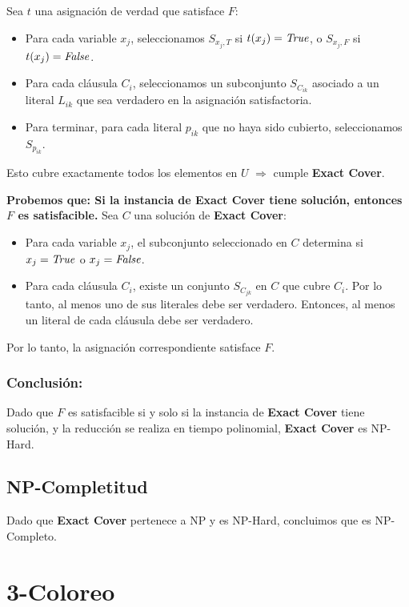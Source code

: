 \documentclass[a4paper,12pt]{article}
\begin{document}
Sea $t$ una asignación de verdad que satisface $F$:
\begin{itemize}
    \item Para cada variable $x_j$, seleccionamos $S_{x_j,T}$ si $t(x_j) = \text{\textit{True}}$, o $S_{x_j,F}$ si $t(x_j) = \text{\textit{False}}$.
    \item Para cada cláusula $C_i$, seleccionamos un subconjunto $S_{C_{ik}}$ asociado a un literal $L_{ik}$ que sea verdadero en la asignación satisfactoria.
    \item Para terminar, para cada literal $p_{ik}$ que no haya sido cubierto, seleccionamos $S_{p_{ik}}$.
\end{itemize}
Esto cubre exactamente todos los elementos en $U$ $\Rightarrow$ cumple \textbf{Exact Cover}.

\textbf{Probemos que: Si la instancia de \textbf{Exact Cover} tiene solución, entonces $F$ es satisfacible.}
Sea $C$ una solución de \textbf{Exact Cover}:
\begin{itemize}
    \item Para cada variable $x_j$, el subconjunto seleccionado en $C$ determina si $x_j = \text{\textit{True}}$ o $x_j = \text{\textit{False}}$.
    \item Para cada cláusula $C_i$, existe un conjunto $S_{C_{jk}}$ en $C$ que cubre $C_i$. Por lo tanto, al menos uno de sus literales debe ser verdadero. Entonces, al menos un literal de cada cláusula debe ser verdadero.
\end{itemize}
Por lo tanto, la asignación correspondiente satisface $F$.

\subsubsection{Conclusión:} Dado que $F$ es satisfacible si y solo si la instancia de \textbf{Exact Cover} tiene solución, y la reducción se realiza en tiempo polinomial, \textbf{Exact Cover} es NP-Hard.

\subsection{NP-Completitud}
Dado que \textbf{Exact Cover} pertenece a NP y es NP-Hard, concluimos que es NP-Completo.





\section{3-Coloreo}
\end{document}
